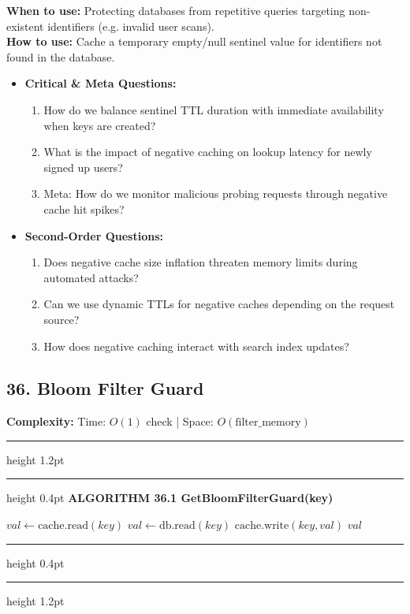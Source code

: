 \documentclass[11pt,a4paper]{article}
\newenvironment{textbookalgo}[2]{%
  \par\addvspace{1.2em}\noindent
  \hrule height 1.2pt
  \vspace{1.5pt}
  \hrule height 0.4pt
  \vspace{5pt}
  {\noindent\large\bfseries\sffamily ALGORITHM #1 \quad #2}
  \par\vspace{5pt}
  \RestyleAlgo{plain}
}{%
  \par\vspace{4pt}
  \hrule height 0.4pt
  \vspace{1.5pt}
  \hrule height 1.2pt
  \par\addvspace{1.2em}
}
\theoremstyle{definition}
\begin{document}
\noindent
\textbf{When to use:} Protecting databases from repetitive queries targeting non-existent identifiers (e.g. invalid user scans).\\
\textbf{How to use:} Cache a temporary empty/null sentinel value for identifiers not found in the database.
\begin{itemize}[leftmargin=*]
  \item[] \textbf{Critical \& Meta Questions:}
  \begin{enumerate}
    \item How do we balance sentinel TTL duration with immediate availability when keys are created?
    \item What is the impact of negative caching on lookup latency for newly signed up users?
    \item Meta: How do we monitor malicious probing requests through negative cache hit spikes?
  \end{enumerate}
  \item[] \textbf{Second-Order Questions:}
  \begin{enumerate}
    \item Does negative cache size inflation threaten memory limits during automated attacks?
    \item Can we use dynamic TTLs for negative caches depending on the request source?
    \item How does negative caching interact with search index updates?
  \end{enumerate}
\end{itemize}
\medskip


\clearpage
\subsection{36. Bloom Filter Guard}

\noindent
\textbf{Complexity:} Time: $O(1)$ check | Space: $O(\text{filter\_memory})$
\smallskip

\begin{textbookalgo}{36.1}{GetBloomFilterGuard(key)}
\begin{algorithm}[H]
$val \leftarrow \text{cache.read}(key)$\;
$val \leftarrow \text{db.read}(key)$\;
$\text{cache.write}(key, val)$\;
\Return $val$\;
\end{algorithm}
\end{textbookalgo}
\end{document}
